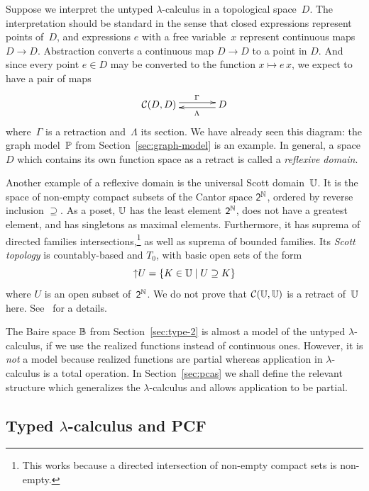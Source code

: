 Suppose we interpret the untyped $\lambda$-calculus in a topological
space~$D$. The interpretation should be standard in the sense that
closed expressions represent points of~$D$, and expressions $e$ with a
free variable~$x$ represent continuous maps $D \to D$. Abstraction
converts a continuous map $D \to D$ to a point in $D$. And since every
point $e \in D$ may be converted to the function $x \mapsto e\,x$, we
expect to have a pair of maps
%
\begin{equation*}
  \xymatrix{
    **[l]{\mathcal{C}(D, D)}
    \ar@<+0.25em>[r]^{\Gamma}
    &
    {D}
    \ar@<+0.25em>[l]^{\Lambda}
  }
\end{equation*}
%
where~$\Gamma$ is a retraction and~$\Lambda$ its section. We have
already seen this diagram: the graph model~$\mathbb{P}$ from
Section~\ref{sec:graph-model} is an example. In general, a space $D$
which contains its own function space as a retract is called a
\emph{reflexive domain}.

Another example of a reflexive domain is the universal Scott
domain~$\mathbb{U}$. It is the space of non-empty compact subsets of the
Cantor space $\mathsf{2}^{\mathbb{N}}$, ordered by reverse inclusion $\supseteq$. As
a poset, $\mathbb{U}$ has the least element $\mathsf{2}^{\mathbb{N}}$, does not have a
greatest element, and has singletons as maximal elements. Furthermore,
it has suprema of directed families intersections,\footnote{This works
  because a directed intersection of non-empty compact sets is
  non-empty.} as well as suprema of bounded families. Its \emph{Scott
  topology} is countably-based and $T_0$, with basic open sets of the
form
%
\begin{equation*}
  {\uparrow}U = \{K \in \mathbb{U} \mid U \supseteq K\}
\end{equation*}
%
where $U$ is an open subset of~$\mathsf{2}^{\mathbb{N}}$. We do not prove that
$\mathcal{C}(\mathbb{U}, \mathbb{U})$ is a retract of~$\mathbb{U}$ here.
See~\cite{ScottGunter,Stoltenberg} for a details.

The Baire space $\mathbb{B}$ from Section~\ref{sec:type-2} is almost a
model of the untyped $\lambda$-calculus, if we use the realized
functions instead of continuous ones. However, it is \emph{not} a
model because realized functions are partial whereas application in
$\lambda$-calculus is a total operation. In Section~\ref{sec:pcas} we
shall define the relevant structure which generalizes the
$\lambda$-calculus and allows application to be partial.


\subsection{Typed $\lambda$-calculus and PCF}
\label{sec:pcf}



